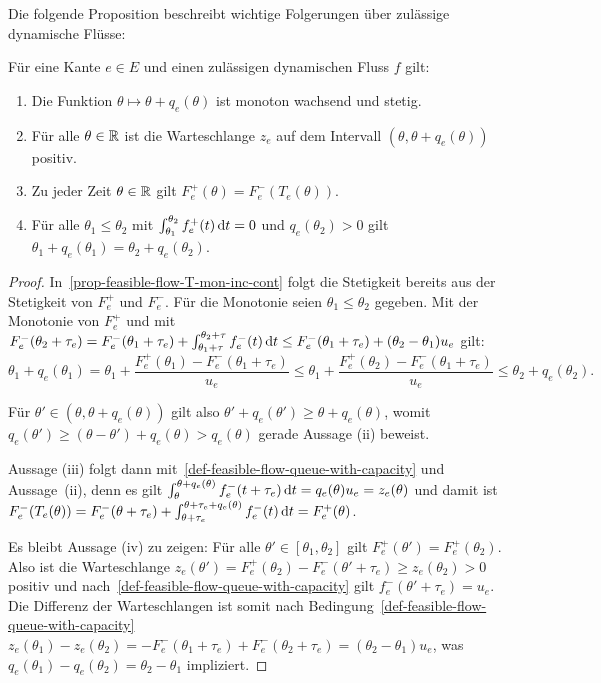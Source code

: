 Die folgende Proposition beschreibt wichtige Folgerungen über zulässige dynamische Flüsse:

\begin{proposition}\label{prop-feasible-flow}
	Für eine Kante $e\in E$ und einen zulässigen dynamischen Fluss $f$ gilt:
	\begin{enumerate}[label=(\roman*)]
		\item\label{prop-feasible-flow-T-mon-inc-cont} Die Funktion $\theta \mapsto \theta + q_e(\theta)$ ist monoton wachsend und stetig.
		\item\label{prop-feasible-flow-positive-queue} Für alle $\theta\in\mathbb{R}$ ist die Warteschlange $z_e$ auf dem Intervall $(\theta, \theta + q_e(\theta))$ positiv.
		\item\label{prop-feasible-flow-det-outflow} Zu jeder Zeit $\theta\in\mathbb{R}$ gilt $F_e^+(\theta) = F_e^-(T_e(\theta))$.
		\item\label{prop-feasible-flow-queue-delay} Für alle $\theta_1 \leq \theta_2$ mit $\int_{\theta_1}^{\theta_2} f^+_e(t) \mathop{}\!\mathrm{d} t = 0$ und $q_e(\theta_2)>0$ gilt $\theta_1 + q_e(\theta_1) = \theta_2 + q_e(\theta_2)$.
	\end{enumerate}
\end{proposition}
\begin{proof}
	In~\ref{prop-feasible-flow-T-mon-inc-cont} folgt die Stetigkeit bereits aus der Stetigkeit von $F_e^+$ und $F_e^-$.
	Für die Monotonie seien $\theta_1 \leq \theta_2$ gegeben.
	Mit der Monotonie von $F_e^+$ und mit $F_e^-(\theta_2 + \tau_e) = F_e^-(\theta_1+\tau_e) + \int_{\theta_1+\tau}^{\theta_2+\tau} f_e^-(t)\mathop{}\!\mathrm{d} t\leq F_e^-(\theta_1 + \tau_e) + (\theta_2 - \theta_1)u_e$ gilt: 
	\[
		\theta_1 + q_e(\theta_1)
		= \theta_1 + \frac{F_e^+(\theta_1) - F_e^-(\theta_1 + \tau_e)}{u_e}
		\leq \theta_1 + \frac{F_e^+(\theta_2) - F_e^-(\theta_1+\tau_e)}{u_e} \leq \theta_2 + q_e(\theta_2).
	\]
	
	Für $\theta'\in (\theta, \theta+q_e(\theta))$ gilt also $\theta' + q_e(\theta') \geq \theta + q_e(\theta)$, womit $q_e(\theta') \geq (\theta - \theta') + q_e(\theta) > q_e(\theta)$ gerade Aussage (ii) beweist.
	
	Aussage (iii) folgt dann mit~\ref{def-feasible-flow-queue-with-capacity} und Aussage~(ii), denn es gilt 
	$\int_{\theta}^{\theta + q_e(\theta)}f_e^-(t + \tau_e) \mathop{}\!\mathrm{d} t = q_e(\theta)  u_e = z_e(\theta)$ und damit ist $F_e^-(T_e(\theta)) = F_e^-(\theta+\tau_e) + \int_{\theta+\tau_e}^{\theta+\tau_e+q_e(\theta)}f_e^-(t)\mathop{}\!\mathrm{d} t = F_e^+(\theta)$.
	
	Es bleibt Aussage (iv) zu zeigen:
	Für alle $\theta'\in [\theta_1, \theta_2]$ gilt $F_e^+(\theta') = F_e^+(\theta_2)$.
	Also ist die Warteschlange $z_e(\theta') = F_e^+(\theta_2) - F_e^-(\theta' + \tau_e) \geq z_e(\theta_2) > 0$ positiv und nach~\ref{def-feasible-flow-queue-with-capacity} gilt $f_e^-(\theta' + \tau_e)=u_e$.
	Die Differenz der Warteschlangen ist somit nach Bedingung~\ref{def-feasible-flow-queue-with-capacity} 
	$z_e(\theta_1)-z_e(\theta_2)=-F^-_e(\theta_1 + \tau_e) + F^-_e(\theta_2 + \tau_e) = (\theta_2 - \theta_1)u_e$, was $q_e(\theta_1) - q_e(\theta_2) = \theta_2 - \theta_1$ impliziert.
\end{proof}